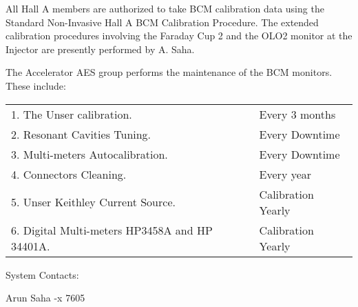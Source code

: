 All Hall A members are authorized to take BCM calibration data using the Standard 
Non-Invasive Hall A BCM Calibration Procedure. The extended calibration procedures 
involving the Faraday Cup 2 and the OLO2 monitor at the Injector are presently 
performed by A. Saha. 

\vskip 0.2cm

The Accelerator AES group performs the maintenance of the BCM monitors. These 
include:

\begin{tabular}{l l}
1. The Unser calibration. & Every 3 months \\
2. Resonant Cavities Tuning. & Every Downtime \\
3. Multi-meters Autocalibration. & Every Downtime \\
4. Connectors Cleaning. &  Every year \\
5. Unser Keithley Current Source. & Calibration Yearly \\
6. Digital Multi-meters HP3458A and HP 34401A. & Calibration Yearly\\   
\end{tabular}

System Contacts:

Arun Saha -x 7605





%
%
%
%
